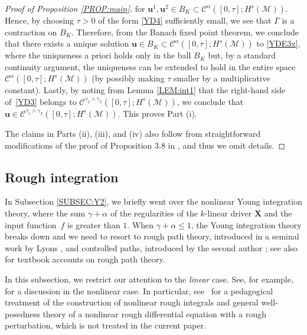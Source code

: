 \documentclass[letterpaper, 11pt,  reqno]{amsart}
\newcommand{\1}{\hspace{0.5mm}\textup{I}\hspace{0.5mm}}
\newcommand{\noi}{\noindent}
\newcommand{\CC}{\mathcal{C}}
\newcommand{\al}{\alpha}
\newcommand{\g}{\gamma}
\newcommand{\G}{\Gamma}
\newcommand{\M}{\mathcal{M}}
\newcommand{\cC}{\mathcal{C}}
\newcommand{\uu}{\mathbf{u}}
\newcommand{\XX}{\mathbf{X}}
\numberwithin{equation}{section}
\numberwithin{theorem}{section}
\begin{document}
\begin{proof}[Proof of Proposition \ref{PROP:main}]
\noi
for $\uu^1, \uu^2 \in B_K\subset 
\cC^\al([0, \tau]; H^s(\M))$.
Hence, 
 by 
 choosing 
$\tau > 0$ of the form \eqref{YD4}
sufficiently small, 
we see that $\G$ is a contraction on $B_K$.
Therefore,  
from the Banach fixed point theorem, 
we conclude that there exists a unique solution 
$\uu \in B_K
\subset \cC^\al([0, \tau]; H^s(\M))$
to \eqref{YDE3x}, 
where 
 the uniqueness a priori holds only in the ball $B_K$
but, by a standard continuity argument, 
the uniqueness  can be extended to hold in the entire space $\CC^\al([0, \tau]; H^s(\M))$
(by possibly making $\tau$ smaller by a multiplicative constant).
Lastly,  by noting from Lemma \ref{LEM:int1}
that the right-hand side of~\eqref{YD3}
belongs to $\CC^{\g_1\wedge \g_2}([0, \tau]; H^s(\M))$, 
we conclude that $\uu \in \CC^{\g_1\wedge \g_2}([0, \tau]; H^s(\M))$.
This proves Part (i).



The claims in Parts (ii), (iii), and (iv) also follow
from straightforward 
modifications
of  the proof of Proposition 3.8 in \cite{CGLLO1}, 
and thus we omit details.
\end{proof}











\subsection{Rough integration}
\label{SUBSEC:Y4}



In Subsection \ref{SUBSEC:Y2}, 
we briefly went over the nonlinear Young integration theory, 
where the sum $\g + \al$ of the regularities of the 
$k$-linear driver $\XX$
and the input function~$f$ is greater than $1$.
When $\g + \al \le 1$,
the Young integration theory breaks down
and we need to resort to rough path theory, 
introduced in a seminal work by Lyons
\cite{Lyons1}, 
and controlled paths, introduced by the second author \cite{Gub04};
 see also 
\cite{Lyons2, FV10, FH20}
for textbook accounts on rough path theory.


In this subsection, 
we restrict our attention to  the {\it linear} case.
See, for example, 
\cite{Gub12, NX, OShao}
for a discussion in the nonlinear case.
In particular, see~\cite{OShao}
for a pedagogical treatment
of the construction of nonlinear rough integrals
and general well-posedness theory
of a nonlinear rough differential equation
with a rough perturbation, which is not treated in the current paper.
\end{document}
